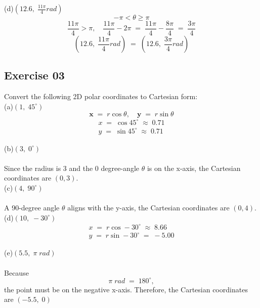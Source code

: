\documentclass[12pt, a4paper]{article}
\begin{document}
	(d)\quad $\left(12.6,\;\frac{11\pi}{4}rad\right)$
		\begin{equation}
			\tag*{}
			-\pi<\theta\geq\pi
		\end{equation}
		\begin{equation}
			\tag*{}
			\frac{11\pi}{4}>\pi,\quad
			\frac{11\pi}{4}-2\pi\;=\;
			\frac{11\pi}{4}-\frac{8\pi}{4}\;=\;
			\frac{3\pi}{4}
		\end{equation}
		\begin{equation}
			\tag*{}
			\left(12.6,\;\frac{11\pi}{4}rad\right)\;=\;
			\left(12.6,\;\frac{3\pi}{4}rad\right)
		\end{equation}
	\newpage\quad
\subsection*{Exercise 03}
Convert the following 2D polar coordinates to Cartesian form:\\

	(a)\quad $(1,\;45^\circ)$
			\begin{equation}
				\tag*{}
				\mathbf{x}\;=\;r\cos\theta,\quad
				\mathbf{y}\;=\;r\sin\theta
			\end{equation}
			\begin{gather}
				\tag*{}
				x\;=\;\cos45^\circ \;\approx\; 0.71 
				\\
				\tag*{}
				y\;=\;\sin45^\circ	\;\approx\; 0.71		
			\end{gather}
	
	(b)\quad $(3,\;0^\circ)$\\\\
	Since the radius is 3 and the 0 degree-angle $\theta$ is on
	the x-axis, the Cartesian coordinates are $(0, 3)$.\\
	
	(c)\quad $(4,\;90^\circ)$\\\\
	A 90-degree angle $\theta$ aligns with the y-axis, the
	Cartesian coordinates are $(0, 4)$.\\
	
	(d)\quad $(10,\;-30^\circ)$
		\begin{gather}
			\tag*{}
			x\;=\;r\cos-30^\circ \;\approx\; 8.66\\
			\tag*{}
			y\;=\;r\sin-30^\circ \;=\; -5.00
		\end{gather}
	
	(e)\quad $(5.5,\;\pi\;rad)$\\\\
		Because\nolinebreak
		\begin{equation}
			\tag*{}
			\pi\;rad\;=\;180^\circ,
		\end{equation}
		\quad the point must be on the negative x-axis.
		Therefore, the Cartesian coordinates are $(-5.5,\;0)$
		
\end{document}

